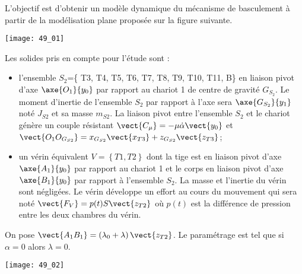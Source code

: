 \normalfalse \difficiletrue \tdifficilefalse
\correctionfalse



\setcounter{question}{0}%
\ifcorrection
\else
{}
\fi

\ifprof
\else

L’objectif est d’obtenir un modèle dynamique du mécanisme de basculement à partir de la modélisation plane proposée sur la figure suivante.


\begin{marginfigure}
\texttt{[image: 49\_01]}
\end{marginfigure}

Les solides pris en compte pour l’étude sont :
\begin{itemize}
\item l'ensemble $S_2$=\{ T3, T4, T5, T6, T7, T8, T9, T10, T11, B\} en liaison pivot d'axe $\axe{O_1}{y_0}$ par rapport au chariot 1 de centre de gravité $G_{S_2}$. Le moment d’inertie de l’ensemble $S_2$ par rapport à l’axe sera $\axe{G_{S_2}}{y_1}$ noté $J_{S2}$ et sa masse $m_{S2}$. La liaison pivot entre l’ensemble $S_2$ et le chariot génère un couple résistant $\vect{C_{\mu}}=-\mu\dot{\alpha}\vect{y_0}$ et $\vect{O_1O_{G_{S2}}}=x_{G_{S2}} \vect{x_{T3}}+z_{G_{S2}} \vect{z_{T3}}$; 
\item un vérin équivalent $V=\left\{ T1,T2\right\}$ dont la tige est en liaison pivot d’axe $\axe{A_1}{y_0}$ par rapport au chariot 1 et le corps en liaison pivot d’axe $\axe{B_1}{y_0}$ par rapport à l’ensemble $S_2$. La masse et l’inertie du vérin sont négligées. Le vérin développe un effort au cours du mouvement qui sera noté $\vect{F_V} = p(t) S \vect{z_{T2}}$ où $p(t)$ est la différence de pression entre les deux chambres du vérin.
\end{itemize}


On pose $\vect{A_1B_1} = \left( \lambda_0+\lambda\right)\vect{z_{T2}}$. Le paramétrage est tel que si $\alpha=0$ alors $\lambda=0$.
\fi



\ifprof
\begin{marginfigure}
\texttt{[image: 49\_02]}
\end{marginfigure}

